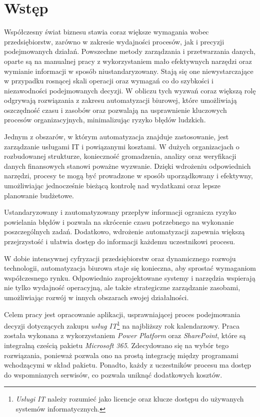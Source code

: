 \chapter{Wstęp}

    Współczesny świat biznesu stawia coraz większe wymagania wobec przedsiębiorstw, zarówno w zakresie wydajności procesów, jak i precyzji podejmowanych działań. Powszechne metody zarządzania i przetwarzania danych, oparte są na manualnej pracy z wykorzystaniem mało efektywnych narzędzi oraz wymianie informacji w sposób niustandaryzowany. Stają się one niewystarczające w przypadku rosnącej skali operacji oraz wymagań co do szybkości i niezawodności podejmowanych decyzji. W obliczu tych wyzwań coraz większą rolę odgrywają rozwiązania z zakresu automatyzacji biurowej, które umożliwiają oszczędność czasu i zasobów oraz pozwalają na usprawnienie kluczowych procesów organizacyjnych, minimalizując ryzyko błędów ludzkich.
    \par Jednym z obszarów, w którym automatyzacja znajduje zastosowanie, jest zarządzanie usługami IT i powiązanymi kosztami. W dużych organizacjach o rozbudowanej strukturze, konieczność gromadzenia, analizy oraz weryfikacji danych finansowych stanowi poważne wyzwanie. Dzięki wdrożeniu odpowiednich narzędzi, procesy te mogą być prowadzone w sposób uporządkowany i efektywny, umożliwiając jednocześnie bieżącą kontrolę nad wydatkami oraz lepsze planowanie budżetowe. 
    \par   Ustandaryzowany i zautomatyzowany przepływ informacji ogranicza ryzyko powielania błędów i pozwala na skrócenie czasu potrzebnego na wykonanie poszczególnych zadań. Dodatkowo, wdrożenie automatyzacji zapewnia większą przejrzystość i ułatwia dostęp do informacji każdemu uczestnikowi procesu. 
    \par W dobie intensywnej cyfryzacji przedsiębiorstw oraz dynamicznego rozwoju technologii, automatyzacja biurowa staje się konieczna, aby sprostać wymaganiom współczesnego rynku. Odpowiednio zaprojektowane systemy i narzędzia wspierają nie tylko wydajność operacyjną, ale także strategiczne zarządzanie zasobami, umożliwiając rozwój w innych obszarach swojej działalności.
    \vspace{1cm}
    \par Celem pracy jest opracowanie aplikacji, usprawniającej proces podejmowania decyzji dotyczących zakupu \emph{usług IT}\footnote{\emph{Usługi IT}  należy rozumieć jako licencje oraz klucze dostępu do używanych systemów informatycznych.} na najbliższy rok kalendarzowy. Praca została wykonana z wykorzystaniem \emph{Power Platform} oraz \emph{SharePoint}, które są integralną cześcią pakietu \emph{Microsoft 365}. Zdecydowano się na wybór tego rozwiązania, ponieważ pozwala ono na prostą integrację między programami wchodzącymi w skład pakietu. Ponadto, każdy z uczestników procesu ma dostęp do wspomnianych serwisów, co pozwala uniknąć dodatkowych kosztów.


